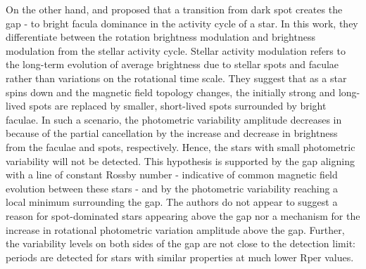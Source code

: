 On the other hand, \citet{reinhold_transition_2019} and \citet{reinhold_stellar_2020} proposed that a transition from dark spot creates the gap - to bright facula dominance in the activity cycle of a star.
In this work, they differentiate between the rotation brightness modulation and brightness modulation from the stellar activity cycle.
Stellar activity modulation refers to the long-term evolution of average brightness due to stellar spots and faculae rather than variations on the rotational time scale.
They suggest that as a star spins down and the magnetic field topology changes, the initially strong and long-lived spots are replaced by smaller, short-lived spots surrounded by bright faculae.
In such a scenario, the photometric variability amplitude decreases in because of the partial cancellation by the increase and decrease in brightness from the faculae and spots, respectively.
Hence, the stars with small photometric variability will not be detected.
This hypothesis is supported by the gap aligning with a line of constant Rossby number - indicative of common magnetic field evolution between these stars - and by the photometric variability reaching a local minimum surrounding the gap.
The authors do not appear to suggest a reason for spot-dominated stars appearing above the gap nor a mechanism for the increase in rotational photometric variation amplitude above the gap.
Further, the variability levels on both sides of the gap are not close to the detection limit: periods are detected for stars with similar properties at much lower Rper values.

